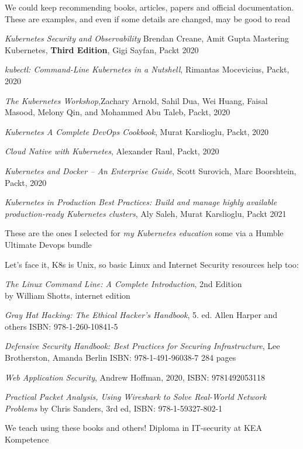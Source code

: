 \documentclass[Screen16to9,17pt]{foils}
\begin{document}

We could keep recommending books, articles, papers and official documentation.
These are examples, and even if some details are changed, may be good to read
\begin{list2}
\item \emph{Kubernetes Security and Observability} Brendan Creane, Amit Gupta %
Mastering Kubernetes, {\bf Third Edition}, Gigi Sayfan, Packt 2020
\item \emph{kubectl: Command-Line Kubernetes in a Nutshell}, Rimantas Mocevicius, Packt, 2020
\item \emph{The Kubernetes Workshop},Zachary Arnold, Sahil Dua, Wei Huang, Faisal Masood, Melony Qin,
and Mohammed Abu Taleb, Packt, 2020
\item \emph{Kubernetes A Complete DevOps Cookbook}, Murat Karslioglu, Packt, 2020
\item \emph{Cloud Native with Kubernetes}, Alexander Raul, Packt, 2020
\item \emph{Kubernetes and Docker – An Enterprise Guide}, Scott Surovich, Marc Boorshtein, Packt, 2020
\item \emph{Kubernetes in Production Best Practices: Build and manage highly available production-ready
Kubernetes clusters}, Aly Saleh, Murat Karslioglu, Packt 2021
\end{list2}

These are the ones I selected for \emph{my Kubernetes education} some via a Humble Ultimate Devops bundle


Let's face it, K8s is Unix, so basic Linux and Internet Security resources help too:
\begin{list2}
\item \emph{The Linux Command Line: A Complete Introduction}, 2nd Edition\\
 by William Shotts, internet edition 
\item \emph{Gray Hat Hacking: The Ethical Hacker's Handbook}, 5. ed. Allen Harper and others ISBN: 978-1-260-10841-5
\item \emph{Defensive Security Handbook: Best Practices for Securing Infrastructure}, Lee Brotherston, Amanda Berlin ISBN: 978-1-491-96038-7 284 pages
\item \emph{Web Application Security}, Andrew Hoffman, 2020, ISBN: 9781492053118
\item \emph{Practical Packet Analysis, Using Wireshark to Solve Real-World Network Problems}
by Chris Sanders, 3rd ed, ISBN: 978-1-59327-802-1
\end{list2}

We teach using these books and others! Diploma in IT-security at KEA Kompetence\\
\end{document}
